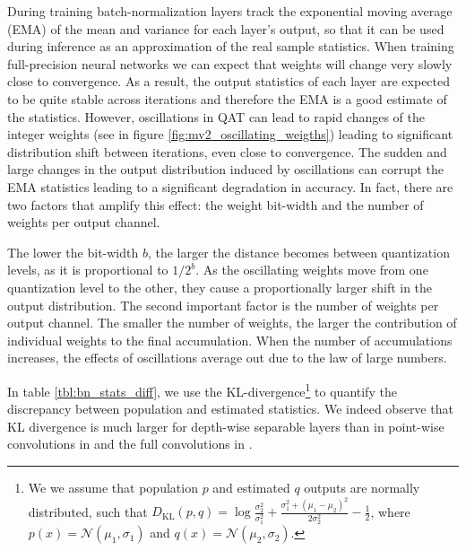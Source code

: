 During training  batch-normalization layers track the exponential moving average (EMA) of the mean and variance for each layer's output, so that it can be used during inference as an approximation of the real sample statistics. 
When training full-precision neural networks we can expect that weights will change very slowly close to convergence. As a result, the output statistics of each layer are expected to be quite stable across iterations and therefore the EMA is a good estimate of the statistics.
However, oscillations in QAT can lead to rapid changes of the integer weights (see in figure \ref{fig:mv2_oscillating_weigths}) leading to significant distribution shift between iterations, even close to convergence.
The sudden and large changes in the output distribution induced by oscillations can corrupt the EMA statistics leading to a significant degradation in accuracy. In fact, there are two factors that amplify this effect: the weight bit-width and the number of weights per output channel.

The lower the bit-width $b$, the larger the distance becomes between quantization levels, as it is proportional to $1/2^b$. As the oscillating weights move from one quantization level to the other, they cause a proportionally larger shift in the output distribution. The second important factor is the number of weights per output channel. The smaller the number of weights, the larger the contribution of individual weights to the final accumulation. When the number of accumulations increases, the effects of oscillations average out due to the law of large numbers. 

In table \ref{tbl:bn_stats_diff}, we use the KL-divergence\footnote{We we assume that population $p$ and estimated $q$ outputs are normally distributed, such that $D_\text{KL}(p,q)=\log{\frac{\sigma^2_2}{\sigma^2_1} + \frac{\sigma^2_1+(\mu_1-\mu_2)^2}{2\sigma_2^2} -\frac{1}{2}}$, where $p(x)=\mathcal{N}(\mu_1, \sigma_1)$ and $q(x)=\mathcal{N}(\mu_2, \sigma_2)$.} to quantify the discrepancy between population and estimated statistics. We indeed observe that KL divergence is much larger for depth-wise separable layers than in point-wise convolutions in  and the full convolutions in .
 
